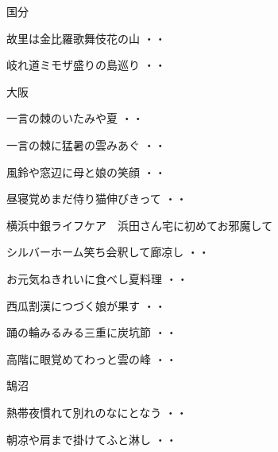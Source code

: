 \vspace{0.4cm}
国分
\begin{shiika}故里は金比羅歌舞伎花の山
\hfill{・・}\end{shiika}
\begin{shiika}岐れ道ミモザ盛りの島巡り
\hfill{・・}\end{shiika}
\vspace{0.4cm}
大阪
\begin{shiika}一言の棘のいたみや夏
\hfill{・・}\end{shiika}
\begin{shiika}一言の棘に猛暑の雲みあぐ
\hfill{・・}\end{shiika}
\begin{shiika}風鈴や窓辺に母と娘の笑顔
\hfill{・・}\end{shiika}
\begin{shiika}昼寝覚めまだ侍り猫伸びきって
\hfill{・・}\end{shiika}
\vspace{0.4cm}
横浜中銀ライフケア　浜田さん宅に初めてお邪魔して
\begin{shiika}シルバーホーム笑ち会釈して廊凉し
\hfill{・・}\end{shiika}
\begin{shiika}お元気ねきれいに食べし夏料理
\hfill{・・}\end{shiika}
\begin{shiika}西瓜割漢につづく娘が果す
\hfill{・・}\end{shiika}
\begin{shiika}踊の輪みるみる三重に炭坑節
\hfill{・・}\end{shiika}
\begin{shiika}高階に眼覚めてわっと雲の峰
\hfill{・・}\end{shiika}
\vspace{0.4cm}
鵠沼
\begin{shiika}熱帯夜慣れて別れのなにとなう
\hfill{・・}\end{shiika}
\begin{shiika}朝凉や肩まで掛けてふと淋し
\hfill{・・}\end{shiika}

